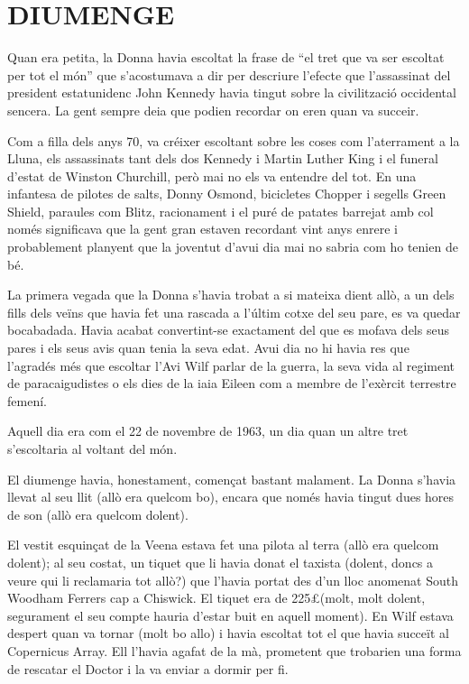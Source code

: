 \chapter*{DIUMENGE}

Quan era petita, la Donna havia escoltat la frase de ``el tret que va
ser escoltat per tot el món'' que s'acostumava a dir per descriure
l'efecte que l'assassinat del president estatunidenc John Kennedy havia
tingut sobre la civilització occidental sencera. La gent sempre deia que
podien recordar on eren quan va succeir.

Com a filla dels anys 70, va créixer escoltant sobre les coses com
l'aterrament a la Lluna, els assassinats tant dels dos Kennedy i Martin
Luther King i el funeral d'estat de Winston Churchill, però mai no els
va entendre del tot. En una infantesa de pilotes de salts, Donny Osmond,
bicicletes Chopper i segells Green Shield, paraules com Blitz,
racionament i el puré de patates barrejat amb col només significava que
la gent gran estaven recordant vint anys enrere i probablement planyent
que la joventut d'avui dia mai no sabria com ho tenien de bé.

La primera vegada que la Donna s'havia trobat a si mateixa dient allò, a
un dels fills dels veïns que havia fet una rascada a l'últim cotxe del
seu pare, es va quedar bocabadada. Havia acabat convertint-se exactament
del que es mofava dels seus pares i els seus avis quan tenia la seva
edat. Avui dia no hi havia res que l'agradés més que escoltar l'Avi Wilf
parlar de la guerra, la seva vida al regiment de paracaigudistes o els
dies de la iaia Eileen com a membre de l'exèrcit terrestre femení.

Aquell dia era com el 22 de novembre de 1963, un dia quan un altre tret
s'escoltaria al voltant del món.

El diumenge havia, honestament, començat bastant malament. La Donna
s'havia llevat al seu llit (allò era quelcom bo), encara que només havia
tingut dues hores de son (allò era quelcom dolent).

El vestit esquinçat de la Veena estava fet una pilota al terra (allò era
quelcom dolent); al seu costat, un tiquet que li havia donat el taxista
(dolent, doncs a veure qui li reclamaria tot allò?) que l'havia portat
des d'un lloc anomenat South Woodham Ferrers cap a Chiswick. El tiquet
era de 225\pounds (molt, molt dolent, segurament el seu compte hauria d'estar
buit en aquell moment). En Wilf estava despert quan va tornar (molt bo
allo) i havia escoltat tot el que havia succeït al Copernicus Array. Ell
l'havia agafat de la mà, prometent que trobarien una forma de rescatar
el Doctor i la va enviar a dormir per fi.

